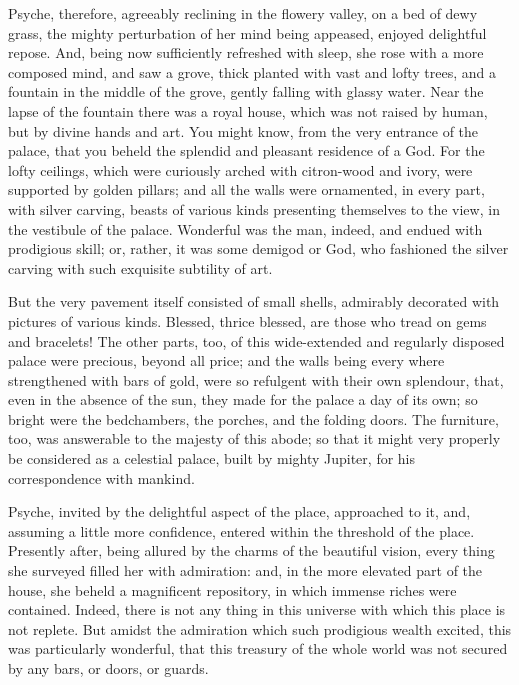 \documentclass{article}
\begin{document}
Psyche, therefore, agreeably reclining in the flowery valley, on a bed of dewy
grass, the mighty perturbation of her mind being appeased, enjoyed delightful
repose. And, being now sufficiently refreshed with sleep, she rose with a more
composed mind, and saw a grove, thick planted with vast and lofty trees, and a
fountain in the middle of the grove, gently falling with glassy water.  Near
the lapse of the fountain there was a royal house, which was not raised by
human, but by divine hands and art. You might know, from the very entrance of
the palace, that you beheld the splendid and pleasant residence of a God. For
the lofty ceilings, which were curiously arched with citron-wood and ivory,
were supported by golden pillars; and all the walls were ornamented, in every
part, with silver carving, beasts of various kinds presenting themselves to the
view, in the vestibule of the palace. Wonderful was the man, indeed, and endued
with prodigious skill; or, rather, it was some demigod or God, who fashioned
the silver carving with such exquisite subtility of art.

But the very pavement itself consisted of small shells, admirably decorated
with pictures of various kinds. Blessed, thrice blessed, are those who tread on
gems and bracelets! The other parts, too, of this wide-extended and regularly
disposed palace were precious, beyond all price; and the walls being every
where strengthened with bars of gold, were so refulgent with their own
splendour, that, even in the absence of the sun, they made for the palace a day
of its own; so bright were the bedchambers, the porches, and the folding doors.
The furniture, too, was answerable to the majesty of this abode; so that it
might very properly be considered as a celestial palace, built by mighty
Jupiter, for his correspondence with mankind.

Psyche, invited by the delightful aspect of the place, approached to it, and,
assuming a little more confidence, entered within the threshold of the place.
Presently after, being allured by the charms of the beautiful vision, every
thing she surveyed filled her with admiration: and, in the more elevated part
of the house, she beheld a magnificent repository, in which immense riches were
contained. Indeed, there is not any thing in this universe with which this
place is not replete. But amidst the admiration which such prodigious wealth
excited, this was particularly wonderful, that this treasury of the whole world
was not secured by any bars, or doors, or guards.
\end{document}
